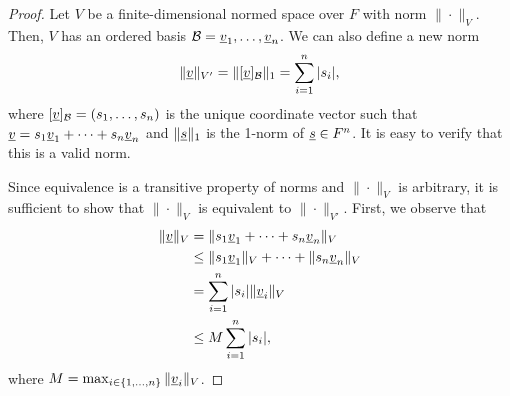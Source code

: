 \begin{proof}
Let $V$ be a finite-dimensional normed space over $F$ with norm $\| \cdot \|_V$.
Then, $V$ has an ordered basis $\mathcal{B} = \underline{v}_1, \ldots, \underline{v}_n$.
We can also define a new norm
\[ \| \underline{v} \|_{V'} = \| [\underline{v}]_\mathcal{B} \|_1 = \sum_{i=1}^n |s_i|, \]
where $[\underline{v}]_\mathcal{B} = (s_1,\ldots,s_n)$ is the unique coordinate vector such that  $\underline{v} = s_1 \underline{v}_1 + \cdots + s_n \underline{v}_n$ and $\| \underline{s} \|_1$ is the 1-norm of $\underline{s}\in F^n$.
It is easy to verify that this is a valid norm.

Since equivalence is a transitive property of norms and $\|\cdot \|_V$ is arbitrary, it is sufficient to show that $\| \cdot \|_{V}$ is equivalent to $\| \cdot \|_{V'}$.
First, we observe that
\begin{align*}
\| \underline{v} \|_{V}
&= \| s_1 \underline{v}_1 + \cdots + s_n \underline{v}_n \|_{V} \\
&\leq \| s_1 \underline{v}_1 \|_V + \cdots + \| s_n \underline{v}_n \|_{V} \\
&= \sum_{i=1}^n |s_i| \| \underline{v}_i \|_V \\
&\leq M \sum_{i=1}^n |s_i|,
\end{align*}
where $M = \max_{i \in \{1,\ldots,n\}} \| \underline{v}_i \|_V$.
 


\end{proof}
